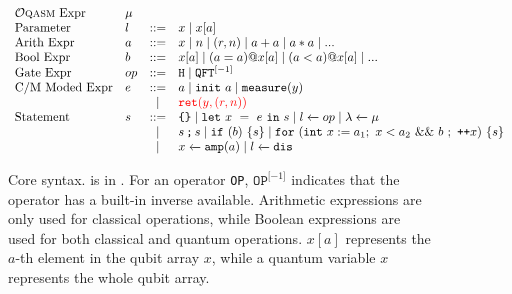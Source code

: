 \begin{figure}[t]
{
  \small
  \[\begin{array}{llcl} 
      \text{\oqasm Expr} & \mu\\
      \text{Parameter} & l & ::= & x \mid x[a] \\
      \text{Arith Expr} & a & ::= & x \mid n \mid (r,n) \mid a + a \mid a * a \mid ... \\
      \text{Bool Expr} & b & ::= & x[a] \mid (a = a) @ x[a] \mid (a < a) @ x[a] \mid ... \\
      \text{Gate Expr} & op & ::= & \texttt{H} \mid \iqft[\lbrack -1 \rbrack]{}{} \\
      \text{C/M Moded Expr}& e & ::= & a \mid \sinit{a} \mid \smea{y}  \\
                           && \mid & \textcolor{red}{\sret{y,(r,n)}} \\
      \text{Statement} & s & ::= & \sskip \mid \sexp{x}{e}{s} \mid  \ssassign{l}{}{op} \mid \ssassign{\lambda}{}{\mu} 
                                 \\ & & \mid & \sseq{s}{s} \mid \sifq{b}{s} \mid
                                     \sqwhile{\sint{x}{a_1}}{x<a_2}{b}{\dplus{x}}{s}
                     \\&&\mid & \ssassign{x}{}{\samp{a}}
                      \mid \ssassign{l}{}{\sdis}
    \end{array}
  \]
}
  \caption{Core \qafny syntax. \oqasm is in . For an operator \texttt{OP}, $\texttt{OP}^{\lbrack -1 \rbrack}$ indicates that the operator has a built-in inverse available. Arithmetic expressions are only used for classical operations, while Boolean expressions are used for both classical and quantum operations. $x[a]$ represents the $a$-th element in the qubit array $x$, while a quantum variable $x$ represents the whole qubit array. }
  \label{fig:vqimp}
\end{figure}

